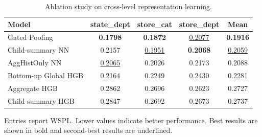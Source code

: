 \begin{table}[H]
\centering
\caption{Ablation study on cross-level representation learning.}
\label{tab:ablation}
\begin{threeparttable}
\begin{tabular}{lcccc}
\toprule
Model & state\_dept & store\_cat & store\_dept & Mean \\
\midrule
Gated Pooling & \textbf{0.1798} & \textbf{0.1872} & \underline{0.2077} & \textbf{0.1916} \\
Child-summary NN & 0.2157 & \underline{0.1951} & \textbf{0.2068} & \underline{0.2059} \\
AggHistOnly NN & \underline{0.2065} & 0.2026 & 0.2173 & 0.2088 \\
Bottom-up Global HGB & 0.2164 & 0.2249 & 0.2430 & 0.2281 \\
Aggregate HGB & 0.2862 & 0.2696 & 0.2623 & 0.2727 \\
Child-summary HGB & 0.2847 & 0.2692 & 0.2673 & 0.2737 \\
\bottomrule
\end{tabular}
\begin{tablenotes}
\footnotesize \item Entries report WSPL. Lower values indicate better performance. Best results are shown in bold and second-best results are underlined.
\end{tablenotes}
\end{threeparttable}
\end{table}
